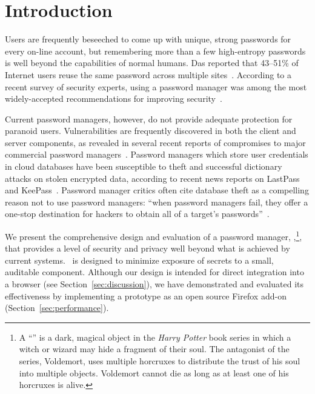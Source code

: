 \section{Introduction}

Users are frequently beseeched to come up with unique, strong passwords for every on-line account, but remembering more than a few high-entropy passwords is well beyond the capabilities of normal humans. Das reported that 43--51\% of Internet users reuse the same password across multiple sites~\cite{das2014tangled}. According to a recent survey of security experts, using a password manager was among the most widely-accepted recommendations for improving security~\cite{ion2015no}.

Current password managers, however, do not provide adequate protection for paranoid users. Vulnerabilities are frequently discovered in both the client and server components, as revealed in several recent reports of compromises to major commercial password managers~\cite{khandelwal2016,goodin2015,titcomb2015,hackernoon2017}. 
Password managers which store user credentials in cloud databases have been susceptible to theft and successful dictionary attacks on stolen encrypted data, according to recent news reports on LastPass~\cite{vinton2015} and KeePass~\cite{goodin2015}. 
Password manager critics often cite database theft as a compelling reason not to use password managers: ``when password managers fail, they offer a one-stop destination for hackers to obtain all of a target's passwords''~\cite{goodin2015}. 

We present the comprehensive design and evaluation of a password manager, \SecPass,\footnote{A ``\SecPass'' is a dark, magical object in the \emph{Harry Potter} book series in which a witch or wizard may hide a fragment of their soul. The antagonist of the series, Voldemort, uses multiple horcruxes to distribute the trust of his soul into multiple objects. Voldemort cannot die as long as at least one of his horcruxes is alive.}, that provides a level of security and privacy well beyond what is achieved by current systems. \SecPass\ is designed to minimize exposure of secrets to a small, auditable component. Although our design is intended for direct integration into a browser (see Section~\ref{sec:discussion}), we have demonstrated and evaluated its effectiveness by implementing a prototype as an open source Firefox add-on (Section~\ref{sec:performance}).

